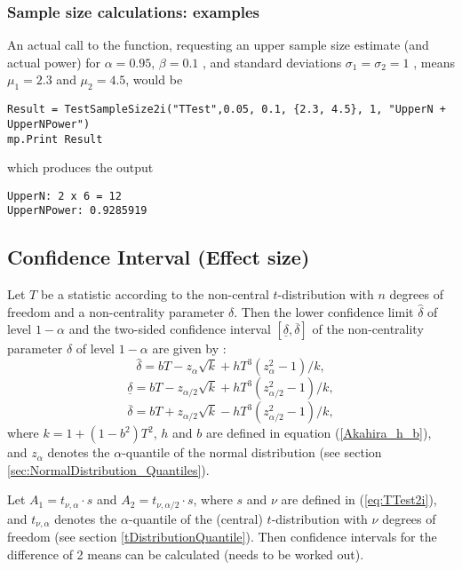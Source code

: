 \subsubsection{Sample size calculations: examples}
An actual call to the function, requesting an upper sample size estimate (and actual power) for $\alpha = 0.95$, $\beta=0.1$ , and standard deviations $\sigma_1=\sigma_2=1$ , means $\mu_1=2.3$ and $\mu_2=4.5$,   would be

\begin{lstlisting}
Result = TestSampleSize2i("TTest",0.05, 0.1, {2.3, 4.5}, 1, "UpperN + UpperNPower")
mp.Print Result
\end{lstlisting}
which produces the output

\begin{verbatim}
UpperN: 2 x 6 = 12
UpperNPower: 0.9285919
\end{verbatim}



\subsection{Confidence Interval (Effect size)}
Let $T$ be a statistic according to the non-central $t$-distribution
with $n$ degrees of freedom and a non-centrality parameter $\delta$. Then
the lower confidence limit $\widehat{\delta}$ of level $1-\alpha$ and the two-sided confidence interval $[ \underline{\delta},\overline{\delta}]$ of the
non-centrality parameter $\delta$ of level $1-\alpha$ are given by \cite{akahira_1995}:
\begin{equation}
	\widehat{\delta} = bT - z_\alpha \sqrt{k} +  h T^3 (z_\alpha^2 - 1)/k,
\end{equation} 
\begin{equation}
	\underline{\delta} = bT - z_{\alpha/2} \sqrt{k} +  h T^3 (z_{\alpha/2}^2 - 1)/k,
\end{equation} 
\begin{equation}
	\overline{\delta} = bT + z_{\alpha/2} \sqrt{k} -  h T^3 (z_{\alpha/2}^2 - 1)/k,
\end{equation} 
where $k=1+(1-b^2)T^2$, $h$ and $b$ are defined in equation (\ref{Akahira_h_b}), and $z_\alpha$ denotes the $\alpha$-quantile of the normal distribution (see section \ref{sec:NormalDistribution_Quantiles}).


Let $A_1=t_{\nu,\alpha} \cdot s$ and $A_2=t_{\nu,\alpha/2} \cdot s$, where $s$ and $\nu$ are defined in (\ref{eq:TTest2i}), and $t_{\nu,\alpha}$ denotes the $\alpha$-quantile of the (central) $t$-distribution with $\nu$ degrees of freedom (see section \ref{tDistributionQuantile}). Then confidence intervals for the difference of 2 means can be calculated (needs to be worked out).



